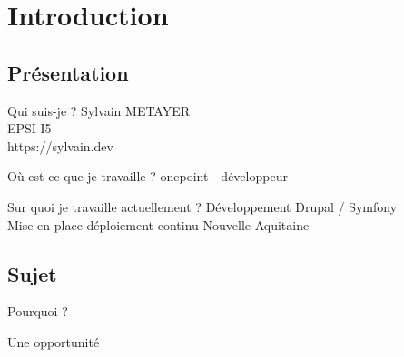 \section{Introduction}

\subsection{Présentation}
\begin{frame}{\subsecname}
	\begin{block}{Qui suis-je ?}
	Sylvain METAYER \\ 
	EPSI I5 \\
	https://sylvain.dev
	\end{block}
	\pause
	\begin{block}{Où est-ce que je travaille ?}
	onepoint - développeur
	\end{block}
	\pause
	\begin{block}{Sur quoi je travaille actuellement ?}
	Développement Drupal / Symfony \\ 	
	Mise en place déploiement continu Nouvelle-Aquitaine
	\end{block}
\end{frame}

\subsection{Sujet}
\begin{frame}{\subsecname}
	 \begin{overprint}
			\begin{block}{Pourquoi ?}
			\end{block}
			\begin{block}{Une opportunité}
			\end{block}
	\end{overprint} 
\end{frame}
